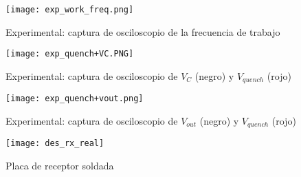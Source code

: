 \begin{figure}[h!]
    \centering
    \texttt{[image: exp\_work\_freq.png]}
    \caption{Experimental: captura de osciloscopio de la frecuencia de trabajo}
    \label{fig:work_freq}
\end{figure}
\begin{figure}[h!]
    \centering
    \texttt{[image: exp\_quench+VC.PNG]}
    \caption{Experimental: captura de osciloscopio de $V_C$ (negro) y $V_{quench}$ (rojo)}
    \label{fig:exp_vc_vquench}
\end{figure}
\begin{figure}[h!]
    \centering
    \texttt{[image: exp\_quench+vout.png]}
    \caption{Experimental: captura de osciloscopio de $V_{out}$ (negro) y $V_{quench}$ (rojo)}
    \label{fig:exp_vout_vquench}
\end{figure}

\begin{figure}[h!]
    \centering
    \texttt{[image: des\_rx\_real]}
    \caption{Placa de receptor soldada}
    \label{fig:exp_placa_rx}
\end{figure}

